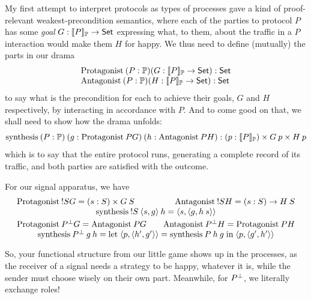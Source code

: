 \documentclass{book}
\newcommand{\D}[1]{\blue{\ensuremath{\mathsf{#1}}}}
\newcommand{\N}[1]{\black{\ensuremath{#1}}}
\newcommand{\lett}[3]{\mathrm{let}\;#1 = #2\;\mathrm{in}\; #3}
\newcommand{\SET}{\D{\mathsf{Set}}}
\newcommand{\pr}[2]{\red{\langle\N{#1},\N{#2}\rangle}}
\begin{document}
My first attempt to interpret protocols as types of processes gave a kind of proof-relevant weakest-precondition semantics, where each of the parties to protocol $P$ has some \emph{goal} $G:\protocol{P}\to\SET$ expressing what, to them, about the traffic in a $P$ interaction would make them $H$ for happy. We thus need to define (mutually) the parts in our drama
\[\begin{array}{l}
\Play{(P:\Protocol)}{(G:\protocol{P}\to\SET)} : \SET \\
\Oppo{(P:\Protocol)}{(H:\protocol{P}\to\SET)} : \SET
\end{array}\]
to say what is the precondition for each to achieve their goals, $G$ and $H$ respectively, by interacting in accordance with $P$. And to come good on that, we shall need to show how the drama unfolds:
\[
\interact{(P:\Protocol)}{(g : \Play{P}{G})}{(h : \Oppo{P}{H})} :
(p:\protocol{P})\times G\:p\times H\: p
\]
which is to say that the entire protocol runs, generating a complete record of its traffic, and both parties are satisfied with the outcome.

For our signal apparatus, we have
\[\begin{array}{l@{\qquad}r}
\Play{\send{S}}{G} = (s:S)\times G\:S &
\Oppo{\send{S}}{H} = (s:S)\to H\:S \\
\multicolumn{2}{c}{
  \interact{\send{S}}{\pr{s}{g}}{h} = \pr{s}{\pr{g}{h\:s}}
  } \smallskip \\
\Play{\op{P}}{G} = \Oppo{P}{G} &
\Oppo{\op{P}}{H} = \Play{P}{H} \\
\multicolumn{2}{c}{
  \interact{\op{P}}{g}{h} =
    \lett{\pr{p}{\pr{h'}{g'}}}{\interact{P}{h}{g}}{\pr{p}{\pr{g'}{h'}}}
  } \smallskip \\
\end{array}\]
So, your functional structure from our little game shows up in the processes, as the receiver of a signal needs a strategy to be happy, whatever it is, while the sender must choose wisely on their own part. Meanwhile, for $\op{P}$, we literally exchange roles!
\end{document}

